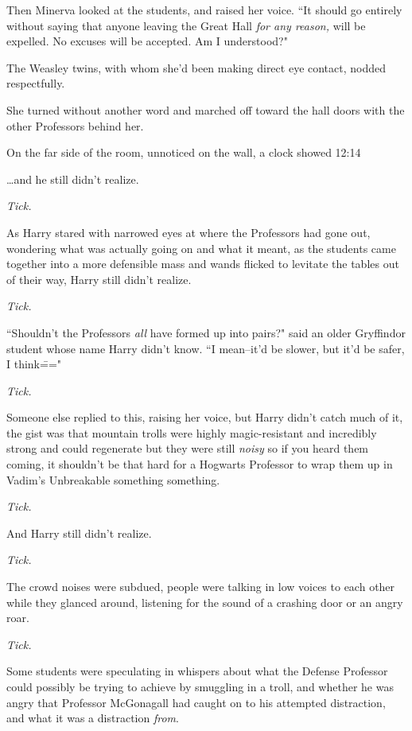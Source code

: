 Then Minerva looked at the students, and raised her voice. ``It should go entirely without saying that anyone leaving the Great Hall \emph{for any reason,} will be expelled. No excuses will be accepted. Am I understood?"

The Weasley twins, with whom she'd been making direct eye contact, nodded respectfully.

She turned without another word and marched off toward the hall doors with the other Professors behind her.

On the far side of the room, unnoticed on the wall, a clock showed 12:14\pm

\later

{\ldots}and he still didn't realize.

\emph{Tick.}

As Harry stared with narrowed eyes at where the Professors had gone out, wondering what was actually going on and what it meant, as the students came together into a more defensible mass and wands flicked to levitate the tables out of their way, Harry still didn't realize.

\emph{Tick.}

``Shouldn't the Professors \emph{all} have formed up into pairs?" said an older Gryffindor student whose name Harry didn't know. ``I mean\---it'd be slower, but it'd be safer, I think\==="

\emph{Tick.}

Someone else replied to this, raising her voice, but Harry didn't catch much of it, the gist was that mountain trolls were highly magic-resistant and incredibly strong and could regenerate but they were still \emph{noisy} so if you heard them coming, it shouldn't be that hard for a Hogwarts Professor to wrap them up in Vadim's Unbreakable something something.

\emph{Tick.}

And Harry still didn't realize.

\emph{Tick.}

The crowd noises were subdued, people were talking in low voices to each other while they glanced around, listening for the sound of a crashing door or an angry roar.

\emph{Tick.}

Some students were speculating in whispers about what the Defense Professor could possibly be trying to achieve by smuggling in a troll, and whether he was angry that Professor McGonagall had caught on to his attempted distraction, and what it was a distraction \emph{from}.

